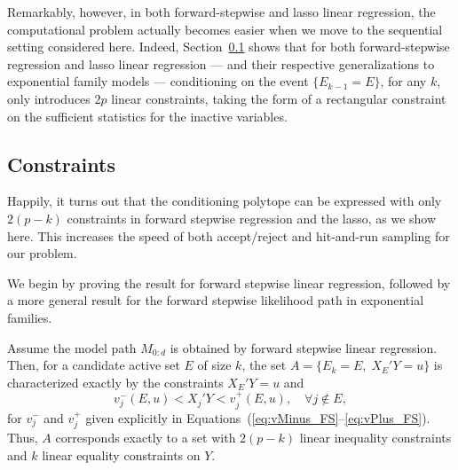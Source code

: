 \documentclass{article}
\begin{document}
Remarkably, however, in both forward-stepwise and lasso linear regression, the computational problem actually becomes easier when we move to the sequential setting considered here. Indeed, Section~\ref{sec:constraints} shows that for both forward-stepwise regression and lasso linear regression --- and their respective generalizations to exponential family models --- conditioning on the event $\{E_{k-1}=E\}$, for any $k$, only introduces $2p$ linear constraints, taking the form of a rectangular constraint on the sufficient statistics for the inactive variables.

\subsection{Constraints}\label{sec:constraints}
Happily, it turns out that the conditioning polytope can be expressed with only $2(p-k)$ constraints in forward stepwise regression and the lasso, as we show here. This increases the speed of both accept/reject and hit-and-run sampling for our problem.

We begin by proving the result for forward stepwise linear regression, followed by a more general result for the forward stepwise likelihood path in exponential families.

\begin{theorem}
  Assume the model path $M_{0:d}$ is obtained by forward stepwise 
  linear regression. Then, for a candidate active set $E$ of size $k$, 
  the set $A = \{E_k = E, \;X_E'Y = u\}$ is characterized 
  exactly by the constraints $X_E'Y=u$ and
  \[
  v_j^-(E,u) < X_j'Y < v_j^+(E,u), \quad\forall j \notin E,
  \]
  for $v_j^-$ and $v_j^+$ given explicitly in
  Equations~(\ref{eq:vMinus_FS}--\ref{eq:vPlus_FS}).
  Thus, $A$ corresponds exactly to 
  a set with $2(p-k)$ linear inequality constraints and $k$
  linear equality constraints on $Y$.
\end{theorem}
\end{document}
